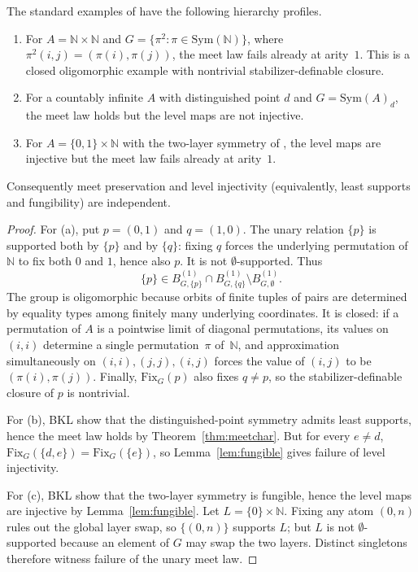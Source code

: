 \documentclass{lmcs}
\newcommand{\Sym}{\mathrm{Sym}}
\newcommand{\Fix}{\mathrm{Fix}}
\begin{document}
\begin{prop}\label{prop:bklpathologies}
The standard examples of \cite[Examples~9.1, 9.9 and 9.10]{BKL14} have the following hierarchy profiles.
\begin{enumerate}[label=\textup{(\alph*)}]
\item For $A=\mathbb N\times\mathbb N$ and $G=\{\pi^2:\pi\in\Sym(\mathbb N)\}$, where $\pi^2(i,j)=(\pi(i),\pi(j))$, the meet law fails already at arity~$1$. This is a closed oligomorphic example with nontrivial stabilizer-definable closure.
\item For a countably infinite $A$ with distinguished point $d$ and $G=\Sym(A)_d$, the meet law holds but the level maps are not injective.
\item For $A=\{0,1\}\times\mathbb N$ with the two-layer symmetry of \cite[Example~9.10]{BKL14}, the level maps are injective but the meet law fails already at arity~$1$.
\end{enumerate}
Consequently meet preservation and level injectivity (equivalently, least supports and fungibility) are independent.
\end{prop}
\begin{proof}
For (a), put $p=(0,1)$ and $q=(1,0)$. The unary relation $\{p\}$ is supported both by $\{p\}$ and by $\{q\}$: fixing $q$ forces the underlying permutation of $\mathbb N$ to fix both $0$ and $1$, hence also $p$. It is not $\emptyset$-supported. Thus
\[
\{p\}\in B^{(1)}_{G,\{p\}}\cap B^{(1)}_{G,\{q\}}\setminus B^{(1)}_{G,\emptyset}.
\]
The group is oligomorphic because orbits of finite tuples of pairs are determined by equality types among finitely many underlying coordinates. It is closed: if a permutation of $A$ is a pointwise limit of diagonal permutations, its values on $(i,i)$ determine a single permutation~$\pi$ of~$\mathbb N$, and approximation simultaneously on $(i,i),(j,j),(i,j)$ forces the value of $(i,j)$ to be $(\pi(i),\pi(j))$. Finally, $\Fix_G(p)$ also fixes $q\neq p$, so the stabilizer-definable closure of $p$ is nontrivial.

For (b), BKL show that the distinguished-point symmetry admits least supports, hence the meet law holds by Theorem~\ref{thm:meetchar}. But for every $e\neq d$,
$\Fix_G(\{d,e\})=\Fix_G(\{e\})$, so Lemma~\ref{lem:fungible} gives failure of level injectivity.

For (c), BKL show that the two-layer symmetry is fungible, hence the level maps are injective by Lemma~\ref{lem:fungible}. Let $L=\{0\}\times\mathbb N$. Fixing any atom $(0,n)$ rules out the global layer swap, so $\{(0,n)\}$ supports $L$; but $L$ is not $\emptyset$-supported because an element of $G$ may swap the two layers. Distinct singletons therefore witness failure of the unary meet law.
\end{proof}
\end{document}
